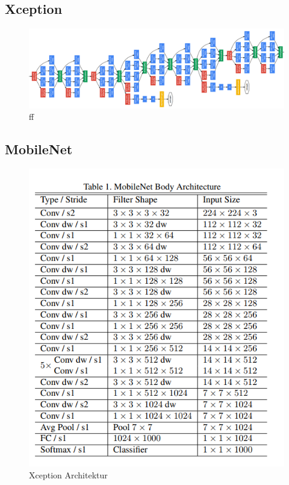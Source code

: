 \documentclass[12pt,a4paper]{scrartcl}
\numberwithin{equation}{section}
\begin{document}
 \subsection{Xception}
  \begin{figure}[h]
 	\centering
 	\includegraphics[width=\textwidth ]{Xception}
 	\caption{ ff }
 	\label{fig:Xception}
 \end{figure}
 \subsection{MobileNet}
   \begin{figure}[h]
 	\centering
 	\includegraphics[width=\textwidth,height=0.8\linewidth]{MobileNet}
 	\caption{ Xception Architektur }
 	\label{fig:MobileNet}
 \end{figure}

 
\end{document}
